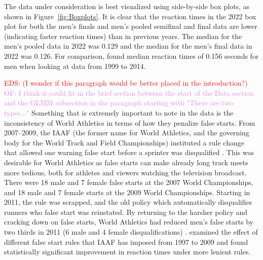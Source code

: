 \documentclass[12pt, letterpaper, titlepage]{article}
\newcommand{\eds}[1]{\textcolor{red}{EDS: (#1)}}
\newcommand{\of}[1]{\textcolor{violet}{OF: #1}}
\begin{document}
The data under consideration is best visualized using side-by-side box plots, as
shown in Figure~\ref{fig:Boxplots}.  It is clear that the reaction times in the 
2022 box plot for both 
the men's finals and men's pooled semifinal and final data are lower (indicating 
faster reaction times)
than in previous years.  The median for the men's pooled data in 2022 was 0.129
and the median for the men's final data in 2022 was 0.126.  For comparison,
\citet{brosnan2017effects} found median reaction times of 0.156 seconds 
for men when looking at data from 1999 to 2014.


\eds{I wonder if this paragraph would be better placed in the introduction?}
\of{I think it could fit in the brief section between the start of the Data section
and the GLMM subsection in the paragraph starting with "There are two types..."}
Something that is extremely important to note in the data is the inconsistency 
of World Athletics in terms of how they penalize false starts.  From 2007--2009,
the IAAF (the former name for World Athletics, and the governing body for the 
World Track and Field Championships) instituted a rule change that allowed one 
warning false start before a sprinter was disqualified \citep{iaaf2009falsestart}. 
This was desirable for World Athletics as false starts can make already long 
track meets more tedious, both for athletes and viewers watching the television 
broadcast.  There were 18 male and 7 female false starts at the 2007 World 
Championships, and 18 male and 7 female starts at the 2009 World Championships. 
Starting in 2011, the rule was scrapped, and the old policy which automatically 
disqualifies runners who false start was reinstated. By returning to the harsher 
policy and cracking down on false starts, World Athletics had reduced men's 
false starts by two thirds in 2011 (6 male and 4 female disqualifications) 
\citep{iaaf2009falsestart}.
\citet{haugen2013effect} examined the effect of different false start
rules that IAAF has imposed from 1997 to 2009 and found statistically 
significant improvement in reaction times under more lenient rules.
\end{document}
